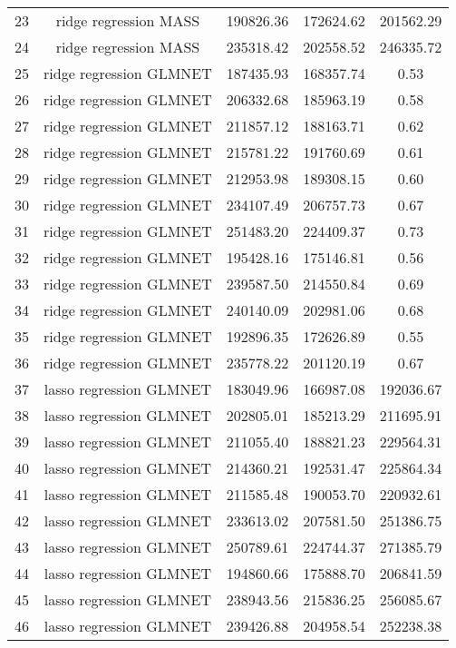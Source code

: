 \begin{tabular}{ccccc}
  23 & ridge regression MASS & 190826.36 & 172624.62 & 201562.29 \\ 
  24 & ridge regression MASS & 235318.42 & 202558.52 & 246335.72 \\ 
  25 & ridge regression GLMNET & 187435.93 & 168357.74 & 0.53 \\ 
  26 & ridge regression GLMNET & 206332.68 & 185963.19 & 0.58 \\ 
  27 & ridge regression GLMNET & 211857.12 & 188163.71 & 0.62 \\ 
  28 & ridge regression GLMNET & 215781.22 & 191760.69 & 0.61 \\ 
  29 & ridge regression GLMNET & 212953.98 & 189308.15 & 0.60 \\ 
  30 & ridge regression GLMNET & 234107.49 & 206757.73 & 0.67 \\ 
  31 & ridge regression GLMNET & 251483.20 & 224409.37 & 0.73 \\ 
  32 & ridge regression GLMNET & 195428.16 & 175146.81 & 0.56 \\ 
  33 & ridge regression GLMNET & 239587.50 & 214550.84 & 0.69 \\ 
  34 & ridge regression GLMNET & 240140.09 & 202981.06 & 0.68 \\ 
  35 & ridge regression GLMNET & 192896.35 & 172626.89 & 0.55 \\ 
  36 & ridge regression GLMNET & 235778.22 & 201120.19 & 0.67 \\ 
  37 & lasso regression GLMNET & 183049.96 & 166987.08 & 192036.67 \\ 
  38 & lasso regression GLMNET & 202805.01 & 185213.29 & 211695.91 \\ 
  39 & lasso regression GLMNET & 211055.40 & 188821.23 & 229564.31 \\ 
  40 & lasso regression GLMNET & 214360.21 & 192531.47 & 225864.34 \\ 
  41 & lasso regression GLMNET & 211585.48 & 190053.70 & 220932.61 \\ 
  42 & lasso regression GLMNET & 233613.02 & 207581.50 & 251386.75 \\ 
  43 & lasso regression GLMNET & 250789.61 & 224744.37 & 271385.79 \\ 
  44 & lasso regression GLMNET & 194860.66 & 175888.70 & 206841.59 \\ 
  45 & lasso regression GLMNET & 238943.56 & 215836.25 & 256085.67 \\ 
  46 & lasso regression GLMNET & 239426.88 & 204958.54 & 252238.38 \\ 

\end{tabular}
